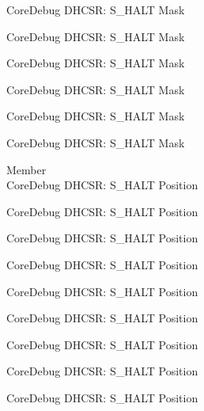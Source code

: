 \begin{DoxyRefList}
\label{deprecated__deprecated000831}%
%
Core\+Debug DHCSR\+: S\+\_\+\+HALT Mask 

\label{deprecated__deprecated000916}%
%
Core\+Debug DHCSR\+: S\+\_\+\+HALT Mask 

\label{deprecated__deprecated000973}%
%
Core\+Debug DHCSR\+: S\+\_\+\+HALT Mask 

\label{deprecated__deprecated001049}%
%
Core\+Debug DHCSR\+: S\+\_\+\+HALT Mask 

\label{deprecated__deprecated001136}%
%
Core\+Debug DHCSR\+: S\+\_\+\+HALT Mask 

\label{deprecated__deprecated001238}%
%
Core\+Debug DHCSR\+: S\+\_\+\+HALT Mask  
\item[Member \doxylink{group___c_m_s_i_s___core_debug_ga760a9a0d7f39951dc3f07d01f1f64772}{Core\+Debug\+\_\+\+DHCSR\+\_\+\+S\+\_\+\+HALT\+\_\+\+Pos} ]\hfill \\
\label{deprecated__deprecated000025}%
%
Core\+Debug DHCSR\+: S\+\_\+\+HALT Position 

\label{deprecated__deprecated000117}%
%
Core\+Debug DHCSR\+: S\+\_\+\+HALT Position 

\label{deprecated__deprecated000171}%
%
Core\+Debug DHCSR\+: S\+\_\+\+HALT Position 

\label{deprecated__deprecated000256}%
%
Core\+Debug DHCSR\+: S\+\_\+\+HALT Position 

\label{deprecated__deprecated000313}%
%
Core\+Debug DHCSR\+: S\+\_\+\+HALT Position 

\label{deprecated__deprecated000389}%
%
Core\+Debug DHCSR\+: S\+\_\+\+HALT Position 

\label{deprecated__deprecated000476}%
%
Core\+Debug DHCSR\+: S\+\_\+\+HALT Position 

\label{deprecated__deprecated000578}%
%
Core\+Debug DHCSR\+: S\+\_\+\+HALT Position 

\label{deprecated__deprecated000684}%
%
Core\+Debug DHCSR\+: S\+\_\+\+HALT Position 


\end{DoxyRefList}
